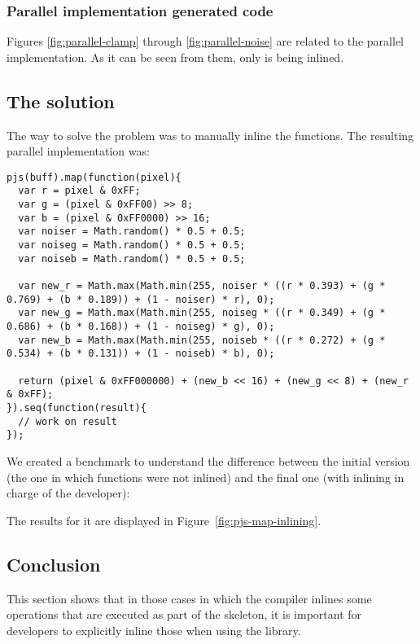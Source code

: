 \subsubsection{Parallel implementation generated code}
Figures \ref{fig:parallel-clamp} through \ref{fig:parallel-noise} are related to the parallel implementation. As it can be seen from them, only  is being inlined.

\subsection{The solution}
The way to solve the problem was to manually inline the functions. The resulting parallel implementation was:
\begin{lstlisting}[caption=Sepia tone final parallel implementation]
pjs(buff).map(function(pixel){
  var r = pixel & 0xFF;
  var g = (pixel & 0xFF00) >> 8;
  var b = (pixel & 0xFF0000) >> 16;
  var noiser = Math.random() * 0.5 + 0.5;
  var noiseg = Math.random() * 0.5 + 0.5;
  var noiseb = Math.random() * 0.5 + 0.5;

  var new_r = Math.max(Math.min(255, noiser * ((r * 0.393) + (g * 0.769) + (b * 0.189)) + (1 - noiser) * r), 0);
  var new_g = Math.max(Math.min(255, noiseg * ((r * 0.349) + (g * 0.686) + (b * 0.168)) + (1 - noiseg) * g), 0);
  var new_b = Math.max(Math.min(255, noiseb * ((r * 0.272) + (g * 0.534) + (b * 0.131)) + (1 - noiseb) * b), 0);

  return (pixel & 0xFF000000) + (new_b << 16) + (new_g << 8) + (new_r & 0xFF);
}).seq(function(result){
  // work on result
});
\end{lstlisting}

We created a benchmark to understand the difference between the initial version (the one in which functions were not inlined) and the final one (with inlining in charge of the developer):

The results for it are displayed in Figure~\ref{fig:pjs-map-inlining}.

\subsection{Conclusion}
This section shows that in those cases in which the compiler inlines some operations that are executed as part of the skeleton, it is important for developers to explicitly inline those when using the library.

\pagebreak
